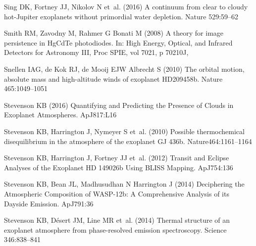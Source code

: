 \documentclass[graybox,natbib,nosecnum]{svmult}
\newcommand*\apj{ApJ}
\newcommand*\apjl{ApJ}
\newcommand*\nat{Nature}
\newcommand*\procspie{Proc SPIE}
\begin{document}
\begin{thebibliography}{110}
{Sing} DK, {Fortney} JJ, {Nikolov} N et~al. (2016) {A continuum from clear to
  cloudy hot-Jupiter exoplanets without primordial water depletion}. \nat
  529:59--62

{Smith} RM, {Zavodny} M, {Rahmer} G {Bonati} M (2008) {A theory for image
  persistence in HgCdTe photodiodes}. In: High Energy, Optical, and Infrared
  Detectors for Astronomy III, \procspie, vol 7021, p 70210J,

{Snellen} IAG, {de Kok} RJ, {de Mooij} EJW {Albrecht} S (2010) {The orbital
  motion, absolute mass and high-altitude winds of exoplanet HD209458b}. \nat
  465:1049--1051

{Stevenson} KB (2016) {Quantifying and Predicting the Presence of Clouds in
  Exoplanet Atmospheres}. \apjl 817:L16

{Stevenson} KB, {Harrington} J, {Nymeyer} S et~al. (2010) {Possible
  thermochemical disequilibrium in the atmosphere of the exoplanet GJ 436b}.
  \nat 464:1161--1164

{Stevenson} KB, {Harrington} J, {Fortney} JJ et~al. (2012) {Transit and Eclipse
  Analyses of the Exoplanet HD 149026b Using BLISS Mapping}. \apj 754:136

{Stevenson} KB, {Bean} JL, {Madhusudhan} N {Harrington} J (2014{})
  {Deciphering the Atmospheric Composition of WASP-12b: A Comprehensive
  Analysis of its Dayside Emission}. \apj 791:36

{Stevenson} KB, {D{\'e}sert} JM, {Line} MR et~al. (2014{}) {Thermal
  structure of an exoplanet atmosphere from phase-resolved emission
  spectroscopy}. Science 346:838--841


\end{thebibliography}
\end{document}
